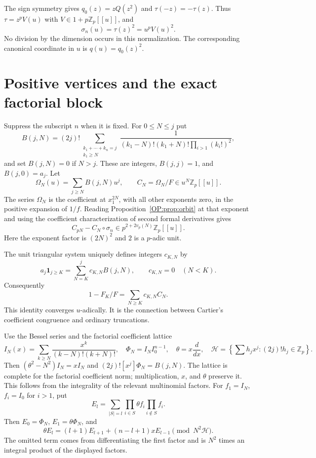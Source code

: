 \documentclass[11pt,a4paper]{article}
\theoremstyle{definition}\newtheorem{definition}[theorem]{Definition}
\theoremstyle{remark}\newtheorem{remark}[theorem]{Remark}
\numberwithin{equation}{section}
\begin{document}
The sign symmetry gives $q_0(z)=zQ(z^2)$ and
$\tau(-z)=-\tau(z)$. Thus $\tau=z^pV(u)$ with
$V\in1+p\mathbb Z_p[[u]]$, and
\[
 \sigma_n(u)=\tau(z)^2=u^pV(u)^2.
\]
No division by the dimension occurs in this normalization. The
corresponding canonical coordinate in $u$ is $q(u)=q_0(z)^2$.

\section{Positive vertices and the exact factorial block}\label{OP:source-main-3}
Suppress the subscript $n$ when it is fixed. For $0\le N\le j$ put
\[
 B(j,N)=(2j)!\sum_{\substack{k_1+\cdots+k_n=j\\k_1\ge N}}
 \frac{1}{(k_1-N)!(k_1+N)!\prod_{i>1}(k_i!)^2},
\]
and set $B(j,N)=0$ if $N>j$. These are integers, $B(j,j)=1$, and
$B(j,0)=a_j$. Let
\[
 \Omega_N(u)=\sum_{j\ge N}B(j,N)u^j,\qquad
 C_N=\Omega_N/F\in u^N\mathbb Z_p[[u]].
\]
The series $\Omega_N$ is the coefficient at $x_1^{2N}$, with all
other exponents zero, in the positive expansion of $1/f$. Reading
Proposition~\ref{OP:prop:orbit} at that exponent and using the
coefficient characterization of second formal derivatives gives
\begin{equation}\label{OP:eq:positive-cartier}
 C_{pN}-C_N\circ\sigma_n
       \in p^{2+2v_p(N)}\mathbb Z_p[[u]].
\end{equation}
Here the exponent factor is $(2N)^2$ and $2$ is a $p$-adic unit.

The unit triangular system uniquely defines integers $c_{K,N}$ by
\[
 a_j\mathbf1_{j\ge K}=\sum_{N=K}^jc_{K,N}B(j,N),
 \qquad c_{K,N}=0\quad(N<K).
\]
Consequently
\begin{equation}\label{OP:eq:exact-tail}
 1-F_K/F=\sum_{N\ge K}c_{K,N}C_N.
\end{equation}
This identity converges $u$-adically. It is the connection between
Cartier's coefficient congruence and ordinary truncations.

Use the Bessel series and the factorial coefficient lattice
\[
 I_N(x)=\sum_{k\ge N}\frac{x^k}{(k-N)!(k+N)!},\quad
 \Phi_N=I_NI_0^{n-1},\quad \theta=x\frac d{dx},\quad
 \mathcal H=\left\{\sum h_jx^j:(2j)!h_j\in\mathbb Z_p\right\}.
\]
Then $(\theta^2-N^2)I_N=xI_N$ and
$(2j)![x^j]\Phi_N=B(j,N)$. The lattice is complete for the factorial
coefficient norm; multiplication, $x$, and $\theta$ preserve it.
This follows from the integrality of the relevant multinomial factors.
For $f_1=I_N$, $f_i=I_0$ for $i>1$, put
\[
 E_l=\sum_{|S|=l}\prod_{i\in S}\theta f_i\prod_{i\notin S}f_i.
\]
Then $E_0=\Phi_N$, $E_1=\theta\Phi_N$, and
\[
 \theta E_l=(l+1)E_{l+1}+(n-l+1)xE_{l-1}
                    \pmod{N^2\mathcal H}.
\]
The omitted term comes from differentiating the first factor and is
$N^2$ times an integral product of the displayed factors.
\end{document}
